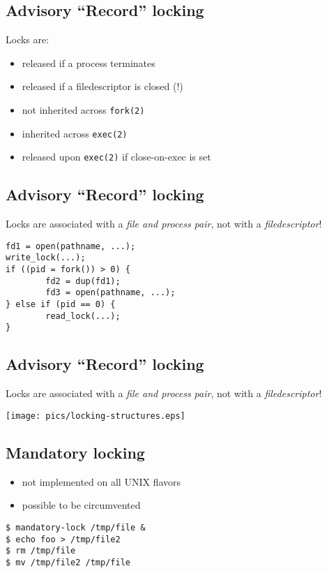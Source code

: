 \documentclass[xga]{xdvislides}
\begin{document}
\subsection{Advisory ``Record'' locking}
Locks are:
\begin{itemize}
	\item released if a process terminates
	\item released if a filedescriptor is closed (!)
	\item not inherited across {\tt fork(2)}
	\item inherited across {\tt exec(2)}
	\item released upon {\tt exec(2)} if close-on-exec is set
\end{itemize}

\subsection{Advisory ``Record'' locking}
Locks are associated with a {\em file and process pair}, not with a {\em filedescriptor}!
\begin{verbatim}
fd1 = open(pathname, ...);
write_lock(...);
if ((pid = fork()) > 0) {
        fd2 = dup(fd1);
        fd3 = open(pathname, ...);
} else if (pid == 0) {
        read_lock(...);
}
\end{verbatim}

\subsection{Advisory ``Record'' locking}
Locks are associated with a {\em file and process pair}, not with a {\em filedescriptor}!
\begin{center}
	\texttt{[image: pics/locking-structures.eps]}
\end{center}

\subsection{Mandatory locking}
\begin{itemize}
	\item not implemented on all UNIX flavors
	\item possible to be circumvented
\end{itemize}
\begin{verbatim}
$ mandatory-lock /tmp/file &
$ echo foo > /tmp/file2
$ rm /tmp/file
$ mv /tmp/file2 /tmp/file
\end{verbatim}
\end{document}
